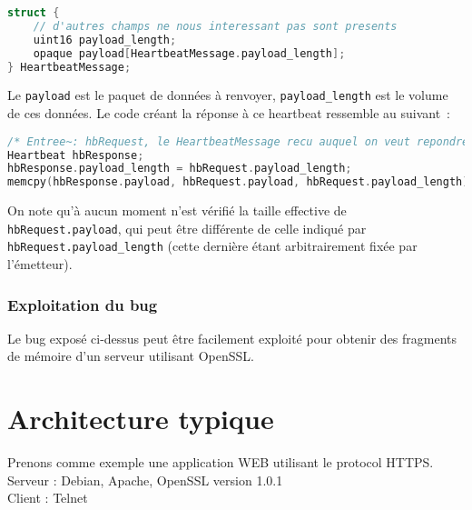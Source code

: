 \documentclass[a4paper,oneside,1pt]{article}
\begin{document}

\begin{lstlisting}[language=C]
struct {
	// d'autres champs ne nous interessant pas sont presents
	uint16 payload_length;
	opaque payload[HeartbeatMessage.payload_length];
} HeartbeatMessage;
\end{lstlisting}

Le \texttt{payload} est le paquet de données à renvoyer, \texttt{payload\_length} est le volume de ces données. Le code créant la réponse à ce heartbeat ressemble au suivant~:

\begin{lstlisting}[language=C]
/* Entree~: hbRequest, le HeartbeatMessage recu auquel on veut repondre */
Heartbeat hbResponse;
hbResponse.payload_length = hbRequest.payload_length;
memcpy(hbResponse.payload, hbRequest.payload, hbRequest.payload_length);
\end{lstlisting}

On note qu'à aucun moment n'est vérifié la taille effective de \texttt{hbRequest.payload}, qui peut être différente de celle indiqué par \texttt{hbRequest.payload\_length} (cette dernière étant arbitrairement fixée par l'émetteur).

\subsubsection{Exploitation du bug}
Le bug exposé ci-dessus peut être facilement exploité pour obtenir des fragments de mémoire d'un serveur utilisant OpenSSL.


\section{Architecture typique}

Prenons comme exemple une application WEB utilisant le protocol HTTPS. \\
Serveur : Debian, Apache, OpenSSL version 1.0.1 \\
\linebreak
Client : Telnet \\


\end{document}
